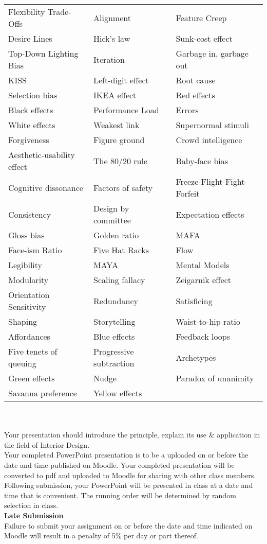 \begin{tabular}{||l|l|l||}
	\hline\hline 
	Flexibility Trade-Offs & Alignment & Feature Creep \\
	Desire Lines & Hick’s law & Sunk-cost effect \\
	Top-Down Lighting Bias & Iteration & Garbage in, garbage out \\
	KISS & Left-digit effect & Root cause \\
	Selection bias & IKEA effect & Red effects \\
	Black effects & Performance Load & Errors \\
	White effects & Weakest link & Supernormal stimuli \\
	Forgiveness & Figure ground & Crowd intelligence \\
	Aesthetic-usability effect & The 80/20 rule & Baby-face bias \\
	Cognitive dissonance & Factors of safety & Freeze-Flight-Fight-Forfeit \\
	Consistency & Design by committee & Expectation effects \\
	Gloss bias & Golden ratio & MAFA \\
	Face-ism Ratio & Five Hat Racks & Flow \\
	Legibility & MAYA & Mental Models \\
	Modularity & Scaling fallacy & Zeigarnik effect \\
	Orientation Sensitivity & Redundancy & Satisficing \\
	Shaping &  Storytelling & Waist-to-hip ratio \\
	Affordances &  Blue effects & Feedback loops \\
	Five tenets of queuing & Progressive subtraction & Archetypes \\
	Green effects &  Nudge & Paradox of unanimity \\
	Savanna preference & Yellow effects & \\
	\hline\hline
\end{tabular}
\\
\\
Your presentation should introduce the principle, explain its use \& application in the field of Interior Design.\\

Your completed PowerPoint presentation is to be a uploaded on or before the date and time published on Moodle.  Your completed presentation will be converted to pdf and uploaded to Moodle for sharing with other class members.\\

Following submission, your PowerPoint will be presented in class at a date and time that is convenient.  The running order will be determined by random selection in class.\\

\textbf{Late Submission}\\
Failure to submit your assignment on or before the date and time indicated on Moodle will result in a penalty of 5\% per day or part thereof.  


